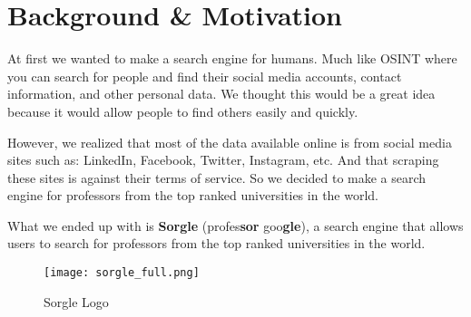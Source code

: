 \section{Background \& Motivation}

At first we wanted to make a search engine for humans. Much like OSINT where you can search for people and find their social media accounts, contact information, and other personal data. We thought this would be a great idea because it would allow people to find others easily and quickly.

However, we realized that most of the data available online is from social media sites such as: LinkedIn, Facebook, Twitter, Instagram, etc. And that scraping these sites is against their terms of service. So we decided to make a search engine for professors from the top ranked universities in the world. 

What we ended up with is \textbf{Sorgle} (profes\textbf{sor} goo\textbf{gle}), a search engine that allows users to search for professors from the top ranked universities in the world.

\begin{figure}[h]
    \centering
    \texttt{[image: sorgle\_full.png]}
    \caption{Sorgle Logo}
    \label{fig:sorgle-logo}
\end{figure}